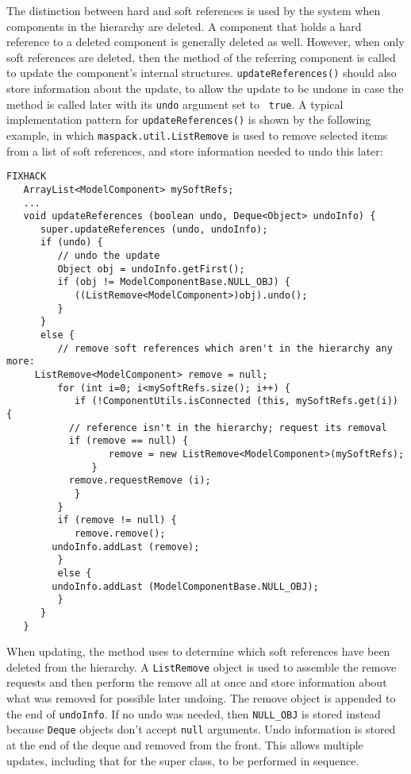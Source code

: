 \documentclass{article}
\begin{document}
The distinction between hard and soft references is used by the system
when components in the hierarchy are deleted. A component that holds a
hard reference to a deleted component is generally deleted as well.
However, when only soft references are deleted, then the
 method of the
referring component is called to update the component's internal
structures. {\tt updateReferences()} should also store information
about the update, to allow the update to be undone in case the method
is called later with its {\tt undo} argument set to {\tt
true}. A typical implementation pattern for {\tt updateReferences()}
is shown by the following example, in which 
{\tt maspack.util.ListRemove} is used to remove selected items from a list
of soft references, and store information needed to undo this later:
\begin{lstlisting}FIXHACK
   ArrayList<ModelComponent> mySoftRefs;
   ...
   void updateReferences (boolean undo, Deque<Object> undoInfo) {
      super.updateReferences (undo, undoInfo); 
      if (undo) {
         // undo the update
         Object obj = undoInfo.getFirst();
         if (obj != ModelComponentBase.NULL_OBJ) {
            ((ListRemove<ModelComponent>)obj).undo();
         }
      }
      else {
         // remove soft references which aren't in the hierarchy any more:
	 ListRemove<ModelComponent> remove = null;
         for (int i=0; i<mySoftRefs.size(); i++) {
            if (!ComponentUtils.isConnected (this, mySoftRefs.get(i)) {
	       // reference isn't in the hierarchy; request its removal
	       if (remove == null) {
                  remove = new ListRemove<ModelComponent>(mySoftRefs);
               }
	       remove.requestRemove (i);
            }
         }
         if (remove != null) {
            remove.remove();
	    undoInfo.addLast (remove);
         }
         else {
	    undoInfo.addLast (ModelComponentBase.NULL_OBJ);
         }               
      }
   }
\end{lstlisting}
When updating, the method uses
 to determine which soft
references have been deleted from the hierarchy.  A {\tt ListRemove}
object is used to assemble the remove requests and then perform the
remove all at once and store information about what was removed for
possible later undoing. The remove object is appended to the end of
{\tt undoInfo}. If no undo was needed, then {\tt NULL\_OBJ} is stored
instead because {\tt Deque} objects don't accept {\tt null} arguments.
Undo information is stored at the end of the deque and removed from
the front. This allows multiple updates, including that
for the super class, to be performed in sequence.
\end{document}
